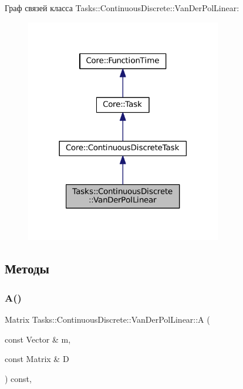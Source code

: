 Граф связей класса Tasks\+:\+:Continuous\+Discrete\+:\+:Van\+Der\+Pol\+Linear\+:\nopagebreak
\begin{figure}[H]
\begin{center}
\leavevmode
\includegraphics[width=242pt]{class_tasks_1_1_continuous_discrete_1_1_van_der_pol_linear__coll__graph}
\end{center}
\end{figure}


\subsection{Методы}
\hypertarget{class_tasks_1_1_continuous_discrete_1_1_van_der_pol_linear_abc0ead5ddd90702a5bbb93b07c74df85}{}\label{class_tasks_1_1_continuous_discrete_1_1_van_der_pol_linear_abc0ead5ddd90702a5bbb93b07c74df85} 
\subsubsection{\texorpdfstring{A()}{A()}}
{\footnotesize\ttfamily Matrix Tasks\+::\+Continuous\+Discrete\+::\+Van\+Der\+Pol\+Linear\+::A (\begin{DoxyParamCaption}\item[{const Vector \&}]{m,  }\item[{const Matrix \&}]{D }\end{DoxyParamCaption}) const\hspace{0.3cm}{\ttfamily [override]}, {\ttfamily [virtual]}}



